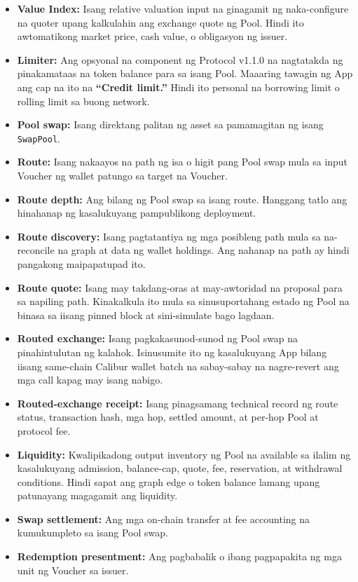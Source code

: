 \documentclass[11pt]{article}
\begin{document}
\begin{itemize}[leftmargin=*]
\item \textbf{Value Index:} Isang relative valuation input na ginagamit ng naka-configure na quoter upang kalkulahin ang exchange quote ng Pool. Hindi ito awtomatikong market price, cash value, o obligasyon ng issuer.
\item \textbf{Limiter:} Ang opsyonal na component ng Protocol v1.1.0 na nagtatakda ng pinakamataas na token balance para sa isang Pool. Maaaring tawagin ng App ang cap na ito na \textbf{``Credit limit.''} Hindi ito personal na borrowing limit o rolling limit sa buong network.
\item \textbf{Pool swap:} Isang direktang palitan ng asset sa pamamagitan ng isang \texttt{SwapPool}.
\item \textbf{Route:} Isang nakaayos na path ng isa o higit pang Pool swap mula sa input Voucher ng wallet patungo sa target na Voucher.
\item \textbf{Route depth:} Ang bilang ng Pool swap sa isang route. Hanggang tatlo ang hinahanap ng kasalukuyang pampublikong deployment.
\item \textbf{Route discovery:} Isang pagtatantiya ng mga posibleng path mula sa na-reconcile na graph at data ng wallet holdings. Ang nahanap na path ay hindi pangakong maipapatupad ito.
\item \textbf{Route quote:} Isang may takdang-oras at may-awtoridad na proposal para sa napiling path. Kinakalkula ito mula sa sinusuportahang estado ng Pool na binasa sa iisang pinned block at sini-simulate bago lagdaan.
\item \textbf{Routed exchange:} Isang pagkakasunod-sunod ng Pool swap na pinahintulutan ng kalahok. Isinusumite ito ng kasalukuyang App bilang iisang same-chain Calibur wallet batch na sabay-sabay na nagre-revert ang mga call kapag may isang nabigo.
\item \textbf{Routed-exchange receipt:} Isang pinagsamang technical record ng route status, transaction hash, mga hop, settled amount, at per-hop Pool at protocol fee.
\item \textbf{Liquidity:} Kwalipikadong output inventory ng Pool na available sa ilalim ng kasalukuyang admission, balance-cap, quote, fee, reservation, at withdrawal conditions. Hindi sapat ang graph edge o token balance lamang upang patunayang magagamit ang liquidity.
\item \textbf{Swap settlement:} Ang mga on-chain transfer at fee accounting na kumukumpleto sa isang Pool swap.
\item \textbf{Redemption presentment:} Ang pagbabalik o ibang pagpapakita ng mga unit ng Voucher sa issuer.

\end{itemize}
\end{document}
